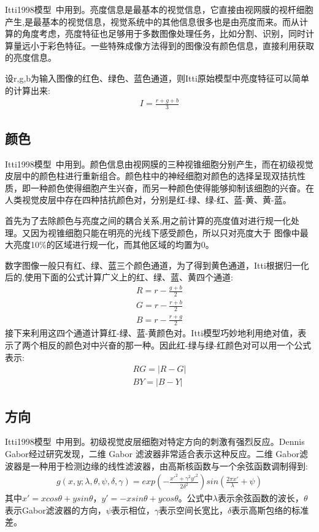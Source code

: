 \documentclass[12pt]{article}
\begin{document}
Itti1998模型~\cite{itti1998model}中用到。亮度信息是最基本的视觉信息，它直接由视网膜的视杆细胞产生,是最基本的视觉信息，视觉系统中的其他信息很多也是由亮度而来。而从计算的角度考虑，亮度特征也足够用于多数图像处理任务，比如分割、识别，同时计算量远小于彩色特征。一些特殊成像方法得到的图像没有颜色信息，直接利用获取的亮度信息。

设r,g,b为输入图像的红色、绿色、蓝色通道，则Itti原始模型中亮度特征可以简单的计算出来:
\begin{align}
I = \frac{r+g+b}{3}
\end{align}

\subsection{颜色}

Itti1998模型~\cite{itti1998model}中用到。颜色信息由视网膜的三种视锥细胞分别产生，而在初级视觉皮层中的颜色柱进行重新组合。颜色柱中的神经细胞对颜色的选择呈现双拮抗性质，即一种颜色使得细胞产生兴奋，而另一种颜色使得能够抑制该细胞的兴奋。在人类视觉皮层中存在四种拮抗颜色对，分别是红-绿、绿-红、蓝-黄、黄-蓝。

首先为了去除颜色与亮度之间的耦合关系,用之前计算的亮度值对进行规一化处理。又因为视锥细胞只能在明亮的光线下感受颜色，所以只对亮度大于 图像中最大亮度10\%的区域进行规一化，而其他区域的均置为0。

数字图像一般只有红、绿、蓝三个颜色通道，为了得到黄色通道，Itti根据归一化后的,使用下面的公式计算广义上的红、绿、蓝、黄四个通道:
\begin{align}
R = r-\frac{g+b}{2}\\
G = r-\frac{r+b}{2}\\
B = r-\frac{r+g}{2}
\end{align}
接下来利用这四个通道计算红-绿、蓝-黄颜色对。Itti模型巧妙地利用绝对值，表示了两个相反的颜色对中兴奋的那一种。因此红-绿与绿-红颜色对可以用一个公式表示:
\begin{align}
RG = |R-G|\\
BY = |B-Y|
\end{align}

\subsection{方向}

Itti1998模型~\cite{itti1998model}中用到。初级视觉皮层细胞对特定方向的刺激有强烈反应。Dennis Gabor经过研究发现，二维 Gabor 滤波器非常适合表示这种反应。二维 Gabor滤波器是一种用于检测边缘的线性滤波器，由高斯核函数与一个余弦函数调制得到:
\begin{align}
g(x, y; \lambda, \theta, \psi, \delta, \gamma) = exp\left(-\frac{x'^2+\gamma^2y'^2}{2\delta^2}\right)sin(\frac{2\pi x'}{\lambda}+\psi)
\end{align}
其中$x'=xcos\theta+ysin\theta$，$y'=-xsin\theta+ycos\theta$。公式中$\lambda$表示余弦函数的波长，$\theta$表示Gabor滤波器的方向，$\psi$表示相位，$\gamma$表示空间长宽比，$\delta$表示高斯包络的标准差。
\end{document}
